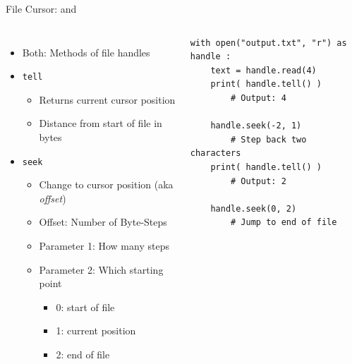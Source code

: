\begin{frame}[fragile]{File Cursor:  and }
%
\begin{columns}[T]
\begin{itemize}
\item Both: Methods of file handles
\item	\texttt{tell}
	\begin{itemize}
	\item Returns current cursor position
	\item Distance from start of file in bytes
	\end{itemize}
\item \texttt{seek}
	\begin{itemize}
	\item Change to cursor position (aka \emph{offset})
	\item Offset: Number of Byte-Steps
	\item Parameter 1: How many steps
	\item Parameter 2: Which starting point
		\begin{itemize}
		\item 0: start of file
		\item 1: current position
		\item 2: end of file
		\end{itemize}
	\end{itemize}
\end{itemize}
%
\begin{codebox}
\begin{verbatim}
with open("output.txt", "r") as handle :
    text = handle.read(4)
    print( handle.tell() )
        # Output: 4
    
    handle.seek(-2, 1)
        # Step back two characters
    print( handle.tell() )
        # Output: 2
    
    handle.seek(0, 2)
        # Jump to end of file
\end{verbatim}
\end{codebox}
%
\end{columns}
%
\end{frame}


